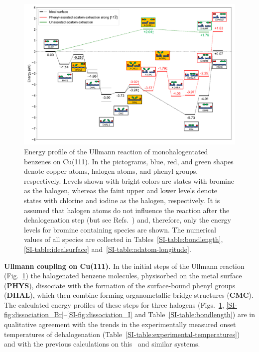 \documentclass[aps,prb,amsmath,amssymb,11pt]{revtex4-1}
\begin{document}
\begin{figure}[bt]
\centering
\includegraphics[width=1.\textwidth]{Fig/main-profile.pdf}
\caption{
Energy profile of the Ullmann reaction of monohalogentated benzenes on Cu(111). In the pictograms, blue, red, and green shapes denote copper atoms, halogen atoms, and phenyl groups, respectively. %
Levels shown with bright colors are states with bromine as the halogen, whereas the faint upper and lower levels denote states with chlorine and iodine as the halogen, respectively. It is assumed that halogen atoms do not influence the reaction after the dehalogenation step (but see Refs.~) and, therefore, only the energy levels for bromine containing species are shown. The numerical values of all species are collected in Tables~\ref{SI-table:bondlength}, \ref{SI-table:idealsurface} and~\ref{SI-table:adatom-longitude}.}
\label{fig:completeenergy}
\end{figure}

\textbf{Ullmann coupling on Cu(111).}
%
In the initial steps of the Ullmann reaction (Fig.~\ref{fig:completeenergy}) the halogenated benzene molecules, physisorbed on the metal surface (\textbf{PHYS}), dissociate with the formation of the surface-bound phenyl groups (\textbf{DHAL}), which then combine forming organometallic bridge structures (\textbf{CMC}).
The calculated energy profiles of these steps for three halogens (Figs.~\ref{fig:completeenergy}, \ref{SI-fig:dissociation_Br}--\ref{SI-fig:dissociation_I} and Table~\ref{SI-table:bondlength}) are in qualitative agreement with the trends in the experimentally measured onset temperatures of dehalogenation (Table~\ref{SI-table:experimental-temperatures})~\cite{ullmann_52,ullmann_87,ullmann_67} and with the previous calculations on this~\cite{jacs2013,ullmann_88} and similar systems. 
\end{document}
